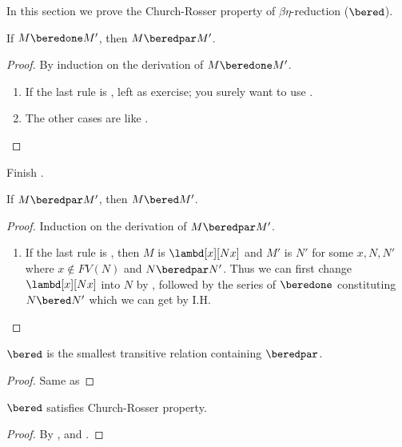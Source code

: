 \documentclass[../../../include/open-logic-section]{subfiles}
\begin{document}


In this section we prove the Church-Rosser property of
$\beta\eta$-reduction ($\bered$).

\begin{lem}
  If $M \beredone M'$, then $M \beredpar M'$.
\end{lem}
\begin{proof} By induction on the derivation of $M \beredone M'$.
  \begin{enumerate}
  \item If the last rule is , left as
    exercise; you surely want to use . 
  \item The other cases are like .
  \end{enumerate}
\end{proof}

\begin{prob}
  Finish .
\end{prob}

\begin{lem}
  If $M \beredpar M'$, then $M \bered M'$.
\end{lem}
\begin{proof} Induction on the derivation of $M \beredpar M'$.
  \begin{enumerate}
    \item If the last rule is , then $M$ is
      $\lambd[x][Nx]$ and $M'$ is $N'$ for some $x, N, N'$ where $x
      \notin FV(N)$ and $N \beredpar N'$. Thus we can first change
      $\lambd[x][Nx]$ into $N$ by , followed by
      the series of $\beredone$ constituting $N \bered N'$ which we
      can get by I.H.
  \end{enumerate}
\end{proof}


\begin{lem}
  $\bered$ is the smallest transitive relation containing $\beredpar$.
\end{lem}
\begin{proof}
  Same as 
\end{proof}

\begin{thm}
  $\bered$ satisfies Church-Rosser property.
\end{thm}
\begin{proof}
  By ,  and .
\end{proof}
\end{document}
